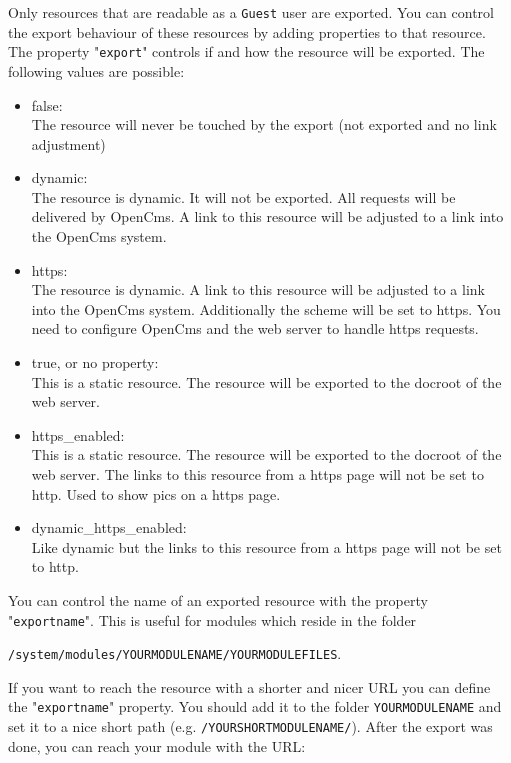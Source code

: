 Only resources that are readable as a \texttt{Guest} user are exported. You can control the export behaviour of these resources by adding properties to that resource. The property "\texttt{export}" controls if and how the resource will be exported. The following values are possible:

\begin{itemize}
\item false:\\
The resource will never be touched by the export (not exported and no link adjustment)

\item dynamic:\\
The resource is dynamic. It will not be exported. All requests will be delivered by OpenCms. A link to this resource will be adjusted to a link into the OpenCms system.

\item https:\\
The resource is dynamic. A link to this resource will be adjusted to a link into the OpenCms system. Additionally the scheme will be set to https. You need to configure OpenCms and the web server to handle https requests.

\item true, or no property:\\
This is a static resource. The resource will be exported to the docroot of the web server.

\item https_enabled:\\
This is a static resource. The resource will be exported to the docroot of the web server. The links to this resource from a https page will not be set to http. Used to show pics on a https page.

\item dynamic_https_enabled:\\
Like dynamic but the links to this resource from a https page will not be set to http. 
\end{itemize}

You can control the name of an exported resource with the property "\texttt{exportname}". This is useful for modules which reside in the folder 

\texttt{/system/modules/YOURMODULENAME/YOURMODULEFILES}. 

If you want to reach the resource with a shorter and nicer URL you can define the "\texttt{exportname}" property. You should add it to the folder \texttt{YOURMODULENAME} and set it to a nice short path (e.g. \texttt{/YOURSHORTMODULENAME/}). After the export was done, you can reach your module with the URL:

